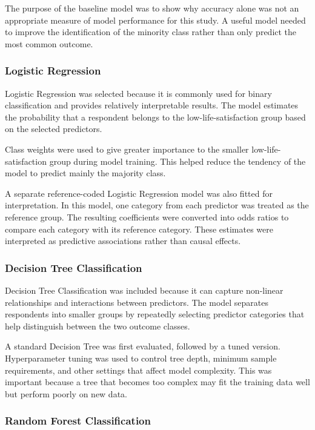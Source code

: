 \documentclass[12pt]{article}
\begin{document}
The purpose of the baseline model was to show why accuracy alone was not an appropriate measure of model performance for this study. A useful model needed to improve the identification of the minority class rather than only predict the most common outcome.

\subsubsection{Logistic Regression}

Logistic Regression was selected because it is commonly used for binary classification and provides relatively interpretable results. The model estimates the probability that a respondent belongs to the low-life-satisfaction group based on the selected predictors.

Class weights were used to give greater importance to the smaller low-life-satisfaction group during model training. This helped reduce the tendency of the model to predict mainly the majority class.

A separate reference-coded Logistic Regression model was also fitted for interpretation. In this model, one category from each predictor was treated as the reference group. The resulting coefficients were converted into odds ratios to compare each category with its reference category. These estimates were interpreted as predictive associations rather than causal effects.

\subsubsection{Decision Tree Classification}

Decision Tree Classification was included because it can capture non-linear relationships and interactions between predictors. The model separates respondents into smaller groups by repeatedly selecting predictor categories that help distinguish between the two outcome classes.

A standard Decision Tree was first evaluated, followed by a tuned version. Hyperparameter tuning was used to control tree depth, minimum sample requirements, and other settings that affect model complexity. This was important because a tree that becomes too complex may fit the training data well but perform poorly on new data.

\subsubsection{Random Forest Classification}
\end{document}
